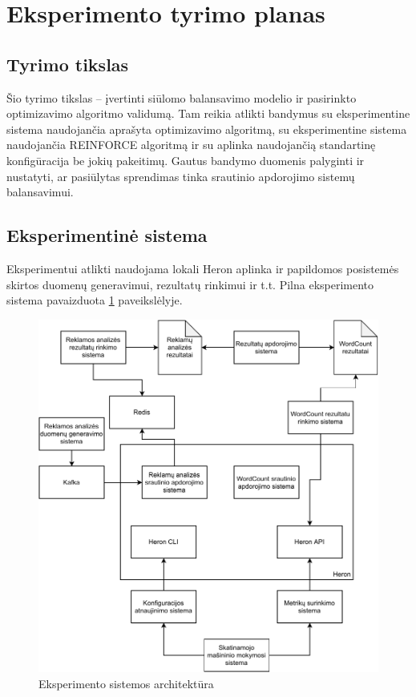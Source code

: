 \documentclass{VUMIFPSbakalaurinis}
\begin{document}
\section{Eksperimento tyrimo planas}

\subsection{Tyrimo tikslas}

Šio tyrimo tikslas – įvertinti siūlomo balansavimo modelio ir pasirinkto optimizavimo algoritmo validumą. Tam reikia atlikti bandymus su eksperimentine sistema naudojančia aprašyta optimizavimo algoritmą, su eksperimentine sistema naudojančia REINFORCE algoritmą ir su aplinka naudojančią standartinę konfigūracija be jokių pakeitimų. Gautus bandymo duomenis palyginti ir nustatyti, ar pasiūlytas sprendimas tinka srautinio apdorojimo sistemų balansavimui.

\subsection{Eksperimentinė sistema}

Eksperimentui atlikti naudojama lokali Heron aplinka ir papildomos posistemės skirtos duomenų generavimui, rezultatų rinkimui ir t.t. Pilna eksperimento sistema pavaizduota \ref{experiment} paveikslėlyje.

\begin{figure}[H]
    \includegraphics[width=14cm]{img/Experiment.pdf}
    \caption{Eksperimento sistemos architektūra}
    \label{experiment}
\end{figure} 
\end{document}
